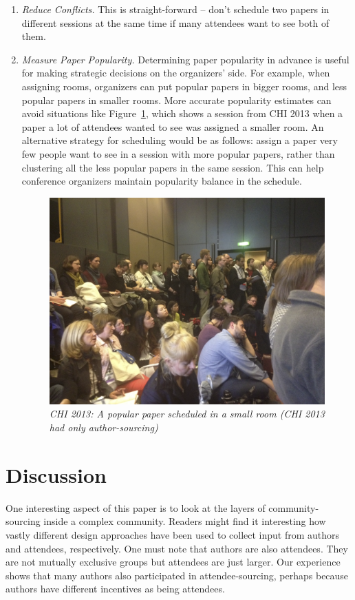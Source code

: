 \documentclass[letterpaper]{article}
\begin{document}
\begin{enumerate}
\begin{enumerate}
\item \emph{Reduce Conflicts.} This is straight-forward -- don't schedule two papers in different sessions at the same time if many attendees want to see both of them. 

\item \emph{Measure Paper Popularity.} Determining paper popularity in advance is useful for making strategic decisions on the organizers' side. For example, when assigning rooms, organizers can put popular papers in bigger rooms, and less popular papers in smaller rooms. More accurate popularity estimates can avoid situations like Figure~\ref{crowded-room}, which shows a session from CHI 2013 when a paper a lot of attendees wanted to see was assigned a smaller room. An alternative strategy for scheduling would be as follows: assign a paper very few people want to see in a session with more popular papers, rather than clustering all the less popular papers in the same session. This can help conference organizers maintain popularity balance in the schedule.
\\

\begin{figure}[!h]
\centering
\includegraphics[width=0.9\columnwidth]{crowded-room.png}
\caption{\emph{CHI 2013: A popular paper scheduled in a small room (CHI 2013 had only author-sourcing)}}
\label{crowded-room}
\end{figure}
\end{enumerate}
\end{enumerate}

\section{Discussion}
One interesting aspect of this paper is to look at the layers of community-sourcing inside a complex community. Readers might find it interesting how vastly different design approaches have been used to collect input from authors and attendees, respectively. One must note that authors are also attendees. They are not mutually exclusive groups but attendees are just larger. Our experience shows that many authors also participated in attendee-sourcing, perhaps because authors have different incentives as being attendees.
\end{document}
